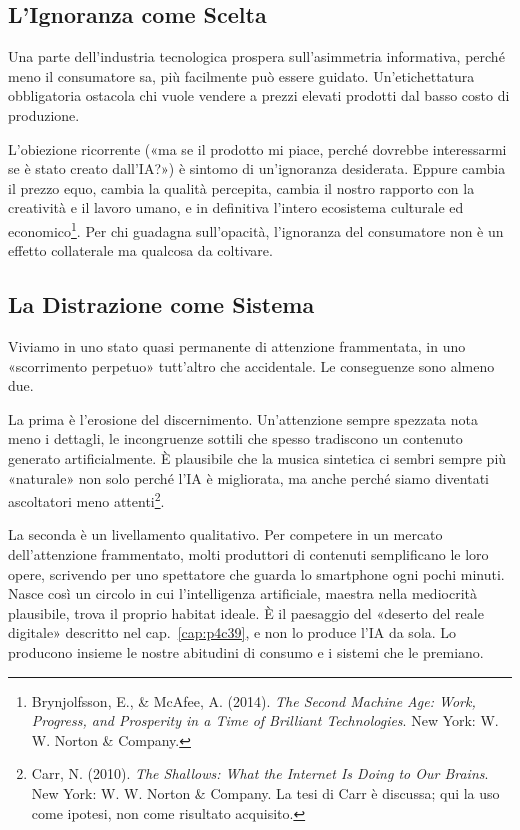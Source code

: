 \subsection{L'Ignoranza come Scelta}

Una parte dell'industria tecnologica prospera sull'asimmetria informativa, perché meno il consumatore sa, più facilmente può essere guidato. Un'etichettatura obbligatoria ostacola chi vuole vendere a prezzi elevati prodotti dal basso costo di produzione.

L'obiezione ricorrente («ma se il prodotto mi piace, perché dovrebbe interessarmi se è stato creato dall'IA?») è sintomo di un'ignoranza desiderata. Eppure cambia il prezzo equo, cambia la qualità percepita, cambia il nostro rapporto con la creatività e il lavoro umano, e in definitiva l'intero ecosistema culturale ed economico\footnote{Brynjolfsson, E., \& McAfee, A. (2014). \textit{The Second Machine Age: Work, Progress, and Prosperity in a Time of Brilliant Technologies}. New York: W. W. Norton \& Company.}. Per chi guadagna sull'opacità, l'ignoranza del consumatore non è un effetto collaterale ma qualcosa da coltivare.

\subsection{La Distrazione come Sistema}

Viviamo in uno stato quasi permanente di attenzione frammentata, in uno «scorrimento perpetuo» tutt'altro che accidentale. Le conseguenze sono almeno due.

La prima è l'erosione del discernimento. Un'attenzione sempre spezzata nota meno i dettagli, le incongruenze sottili che spesso tradiscono un contenuto generato artificialmente. È plausibile che la musica sintetica ci sembri sempre più «naturale» non solo perché l'IA è migliorata, ma anche perché siamo diventati ascoltatori meno attenti\footnote{Carr, N. (2010). \textit{The Shallows: What the Internet Is Doing to Our Brains}. New York: W. W. Norton \& Company. La tesi di Carr è discussa; qui la uso come ipotesi, non come risultato acquisito.}.

La seconda è un livellamento qualitativo. Per competere in un mercato dell'attenzione frammentato, molti produttori di contenuti semplificano le loro opere, scrivendo per uno spettatore che guarda lo smartphone ogni pochi minuti. Nasce così un circolo in cui l'intelligenza artificiale, maestra nella mediocrità plausibile, trova il proprio habitat ideale. È il paesaggio del «deserto del reale digitale» descritto nel cap.~\ref{cap:p4c39}, e non lo produce l'IA da sola. Lo producono insieme le nostre abitudini di consumo e i sistemi che le premiano.

